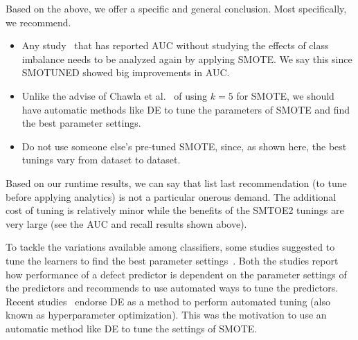 \documentclass[10pt,conference]{IEEEtran}
\newcommand{\bi}{\begin{itemize}[leftmargin=0.4cm]}
\newcommand{\ei}{\end{itemize}}
\theoremstyle{break}
\theoremstyle{break}
\begin{document}
Based on the above, we offer a specific and general conclusion. Most specifically, we recommend.
\bi
 \item Any study~\cite{ghotra2015revisiting} that has reported AUC without studying the effects of class imbalance needs to be analyzed again by applying SMOTE. We say this since SMOTUNED showed big improvements in AUC.
 \item Unlike the advise of Chawla et al.~\cite{chawla2002smote} of using $k=5$ for SMOTE, we should have automatic methods like DE to tune the parameters of SMOTE and find the best parameter settings.
 \item Do not use someone else's pre-tuned SMOTE, since, as shown here, the best tunings vary from dataset to dataset.
\ei
Based on our runtime results, we can say that list last
recommendation (to tune before applying analytics) is not  a particular
onerous demand. The additional cost of tuning
is relatively minor while the benefits of the SMTOE2 tunings
are very large (see the   AUC and recall results shown above).



\balance



%
\medskip



To tackle the variations available among classifiers, some studies suggested to tune the learners to find the best parameter settings~\cite{tantithamthavorn2016automated, fu2016tuning}.  Both the studies report how performance of a defect predictor is dependent on the parameter settings of the predictors and recommends to use automated ways to tune the predictors.
Recent studies~\cite{fu2016tuning, agrawal2016wrong} endorse DE as a method to perform automated tuning (also known as hyperparameter optimization). This was the motivation to use an automatic method like DE to
tune the settings of SMOTE.
\end{document}
